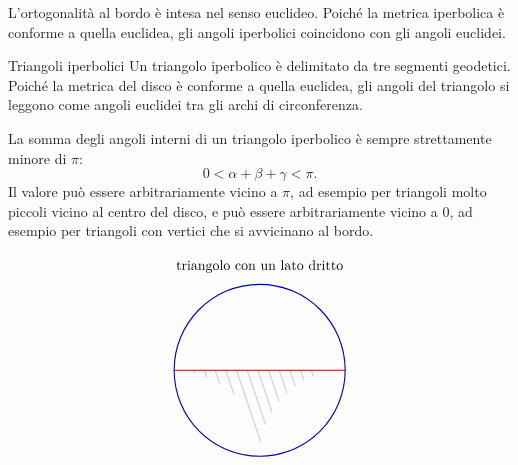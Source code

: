 \documentclass[a4paper]{article}
\begin{document}
L'ortogonalità al bordo è intesa nel senso euclideo. Poiché la metrica iperbolica è conforme a quella euclidea, gli angoli iperbolici coincidono con gli angoli euclidei.


\begin{snippetexample}{Triangoli iperbolici}
Un triangolo iperbolico è delimitato da tre segmenti geodetici. Poiché la metrica del disco è conforme a quella euclidea, gli angoli del triangolo si leggono come angoli euclidei tra gli archi di circonferenza.

La somma degli angoli interni di un triangolo iperbolico è sempre strettamente minore di \(\pi\):
\[
    0<\alpha+\beta+\gamma<\pi.
\]
Il valore può essere arbitrariamente vicino a \(\pi\), ad esempio per triangoli molto piccoli vicino al centro del disco, e può essere arbitrariamente vicino a \(0\), ad esempio per triangoli con vertici che si avvicinano al bordo.

\[
\begin{tikzpicture}[scale=0.9, line cap=round, line join=round]

    \colorlet{bordodisco}{blue!70!black}
    \colorlet{geod}{red!80!black}
    \colorlet{tratteggio}{blue!45}

    \begin{scope}[shift={(0,0)}]
        \def\R{2.4}

        \node at (0,2.9) {triangolo con un lato dritto};

        \coordinate (A) at (-\R,0);
        \coordinate (B) at ( \R,0);
        \coordinate (C) at (0,-\R);

        \draw[bordodisco, thick] (0,0) circle[radius=\R];

        \begin{scope}
            \clip
                (A) -- (B)
                arc[start angle=90, end angle=180, radius=\R]
                arc[start angle=0, end angle=90, radius=\R]
                -- cycle;

            \foreach \x in {-2.2,-1.9,-1.6,-1.3,-1.0,-0.7,-0.4,-0.1,0.2,0.5,0.8,1.1,1.4} {
                \draw[tratteggio, thin] (\x,0.15) -- ({\x+0.85},-2.35);
            }
        \end{scope}

        \draw[geod, thick] (A) -- (B);


\end{scope}
\end{tikzpicture}\]
\end{snippetexample}
\end{document}
